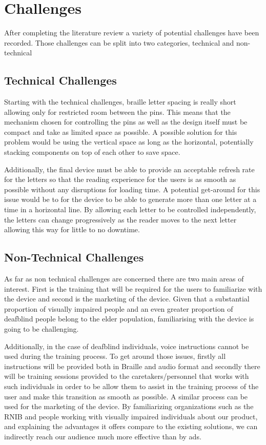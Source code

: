 \section{Challenges}
After completing the literature review a variety of potential challenges have been recorded.
Those challenges can be split into two categories, technical and non-technical 

\subsection{Technical Challenges}
Starting with the technical challenges, braille letter spacing is really short allowing only for restricted room between the pins.
This means that the mechanism chosen for controlling the pins as well as the design itself must be compact and take as limited space as possible.
A possible solution for this problem would be using the vertical space as long as the horizontal, potentially stacking components on top of each other to save space.

Additionally, the final device must be able to provide an acceptable refresh rate for the letters so that the reading experience for the users is as smooth as possible without any disruptions for loading time.
A potential get-around for this issue would be to for the device to be able to generate more than one letter at a time in a horizontal line.
By allowing each letter to be controlled independently, the letters can change progressively as the reader moves to the next letter allowing this way for little to no downtime.
 

\subsection{Non-Technical Challenges}
As far as non technical challenges are concerned there are two main areas of interest.
First is the training that will be required for the users to familiarize with the device and second is the marketing of the device.
Given that a substantial proportion of visually impaired people and an even greater proportion of deafblind people belong to the elder population, familiarising with the device is going to be challenging.

Additionally, in the case of deafblind individuals, voice instructions cannot be used during the training process.
To get around those issues, firstly all instructions will be provided both in Braille and audio format and secondly there will be training sessions provided to the caretakers/personnel that works with such individuals in order to be allow them to assist in the training process of the user and make this transition as smooth as possible.
A similar process can be used for the marketing of the device.
By familiarizing organizations such as the RNIB and people working with visually impaired individuals about our product, and explaining the advantages it offers compare to the existing solutions, we can indirectly reach our audience much more effective than by ads.
 